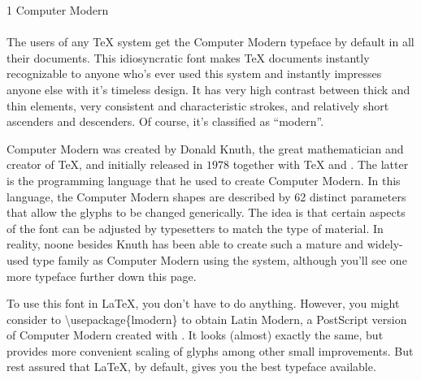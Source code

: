\documentclass{article}
\begin{document}
\frenchspacing

\noindent
{\LARGE 1 Computer Modern}\\
~\\
\noindent
The users of any \TeX{} system get the Computer Modern typeface by default in
all their documents.  This idiosyncratic font makes \TeX{} documents
instantly recognizable to anyone who's ever used this system and instantly
impresses anyone else with it's timeless design.  It has very high contrast
between thick and thin elements, very consistent and characteristic
strokes, and relatively short ascenders and descenders.  Of course, it's
classified as ``modern''.

Computer Modern was created by Donald Knuth, the great mathematician and
creator of \TeX, and initially released in $1978$ together with \TeX{} and
\MF.  The latter is the programming language that he used to create Computer
Modern.  In this language, the Computer Modern shapes are described by 62
distinct parameters that allow the glyphs to be changed generically.  The
idea is that certain aspects of the font can be adjusted by typesetters to
match the type of material.  In reality, noone besides Knuth has been able
to create such a mature and widely-used type family as Computer Modern using
the \MF{} system, although you'll see one more \MF{} typeface further down
this page.

To use this font in \LaTeX, you don't have to do anything. However, you might consider
to \textbackslash usepackage\{lmodern\} to obtain Latin Modern,
a PostScript version of Computer Modern created with \MP.  It looks
(almost) exactly the same, but provides more convenient scaling of glyphs
among other small improvements.  But rest assured that \LaTeX{}, by default,
gives you the best typeface available.
\end{document}
